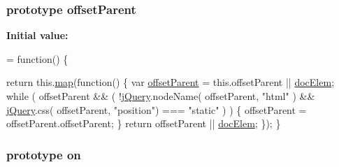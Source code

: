 \subsubsection[{offset\+Parent}]{ {\bf prototype} offset\+Parent}\label{jquery-1_810_82-vsdoc_8js_a2d4c0b0aec0a3b2c4e287976b2587d82}
{\bfseries Initial value\+:}
\begin{DoxyCode}
= \textcolor{keyword}{function}() \{


        \textcolor{keywordflow}{return} this.\hyperlink{jquery-1_810_82-vsdoc_8js_a20838f8c4bedc779e51bf830f5a4d471}{map}(\textcolor{keyword}{function}() \{
            var \hyperlink{jquery-1_810_82-vsdoc_8js_a2d4c0b0aec0a3b2c4e287976b2587d82}{offsetParent} = this.offsetParent || \hyperlink{_bibabook_2_scripts_2respond_8js_a5fb2b54cff340aa6e8fb7831cf99ec95}{docElem};
            \textcolor{keywordflow}{while} ( offsetParent && ( !\hyperlink{jquery-1_810_82-vsdoc_8js_add5237586d970a38a81f990e8eb28c6c}{jQuery}.nodeName( offsetParent, \textcolor{stringliteral}{"html"} ) && 
      \hyperlink{jquery-1_810_82-vsdoc_8js_add5237586d970a38a81f990e8eb28c6c}{jQuery}.css( offsetParent, \textcolor{stringliteral}{"position"}) === \textcolor{stringliteral}{"static"} ) ) \{
                offsetParent = offsetParent.offsetParent;
            \}
            \textcolor{keywordflow}{return} offsetParent || \hyperlink{_bibabook_2_scripts_2respond_8js_a5fb2b54cff340aa6e8fb7831cf99ec95}{docElem};
        \});
    \}
\end{DoxyCode}
\hypertarget{jquery-1_810_82-vsdoc_8js_ae453b412b883f60220d73468ef6c6dbc}{}
\subsubsection[{on}]{ {\bf prototype} on}\label{jquery-1_810_82-vsdoc_8js_ae453b412b883f60220d73468ef6c6dbc}
\hypertarget{jquery-1_810_82-vsdoc_8js_a4b549c0fa19045218624f5384762bf17}{}
